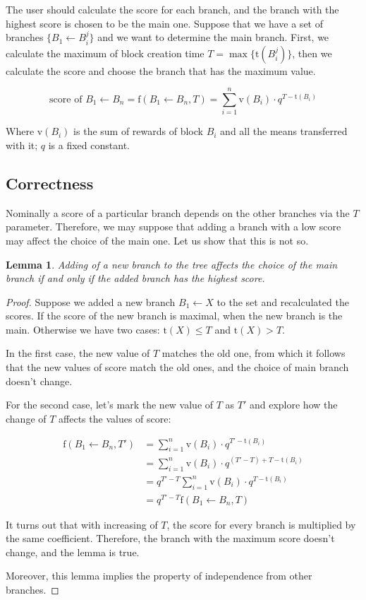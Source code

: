 \documentclass[12pt]{article}
\newtheorem{lemma}{Lemma}[section]
\begin{document}
The user should calculate the score for each branch, and the branch with the highest score is chosen to be the main one. Suppose that we have a set of branches $\{B_1 \leftarrow B_i^j\}$ and we want to determine the main branch. First, we calculate the maximum of block creation time $T = \max{\{\mathrm{t}(B_i^j)\}}$, then we calculate the score and choose the branch that has the maximum value.

$$
\text{score of $B_1 \leftarrow B_n$} = \mathrm{f}(B_1 \leftarrow B_n, T) = 
\sum_{i=1}^{n} \mathrm{v}(B_i)\cdot{}q^{T-\mathrm{t}(B_i)}
$$

Where $\mathrm{v}(B_i)$ is the sum of rewards of block $B_i$ and all the means transferred with it; $q$ is a fixed constant.

\subsection{Correctness}

Nominally a score of a particular branch depends on the other branches via the $T$ parameter. Therefore, we may suppose that adding a branch with a low score may affect the choice of the main one. Let us show that this is not so.

\begin{lemma}
Adding of a new branch to the tree affects the choice of the main branch if and only if the added branch has the highest score.
\end{lemma}

\begin{proof}
Suppose we added a new branch $B_1 \leftarrow X$ to the set and recalculated the scores. If the score of the new branch is maximal, when the new branch is the main. Otherwise we have two cases: $\mathrm{t}(X) \le T$ and $\mathrm{t}(X) > T$.

In the first case, the new value of $T$ matches the old one, from which it follows that the new values of score match the old ones, and the choice of main branch doesn't change.

For the second case, let's mark the new value of $T$ as $T'$ and explore how the change of $T$ affects the values of score:

\begin{equation*}
\begin{split}
\mathrm{f}(B_1 \leftarrow B_n, T') 
&= \sum_{i=1}^{n} \mathrm{v}(B_i)\cdot{}q^{T'-\mathrm{t}(B_i)} \\
&= \sum_{i=1}^{n} \mathrm{v}(B_i)\cdot{}q^{(T'-T)+T-\mathrm{t}(B_i)} \\
&= q^{T'-T} \sum_{i=1}^{n} \mathrm{v}(B_i)\cdot{}q^{T-\mathrm{t}(B_i)} \\
&= q^{T'-T} \mathrm{f}(B_1 \leftarrow B_n, T) 
\end{split}
\end{equation*}

It turns out that with increasing of $T$, the score for every branch is multiplied by the same coefficient. Therefore, the branch with the maximum score doesn't change, and the lemma is true.

Moreover, this lemma implies the property of independence from other branches.
\end{proof}
\end{document}
